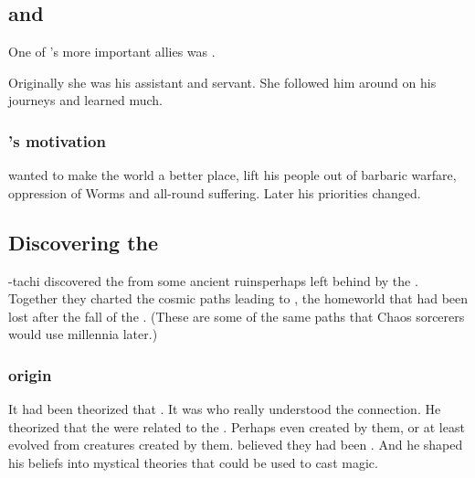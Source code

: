 \subsection[Sethicus and Tyrasshana]{\Sethicus and \Tiamat}
One of \Sethicus's more important allies was . 

Originally she was his assistant and servant.
She followed him around on his journeys and learned much. 





\subsubsection{\Sethicus's motivation}
\Sethicus wanted to make the world a better place, lift his people out of barbaric warfare, oppression of Worms and all-round suffering.
Later his priorities changed. 









\subsection{Discovering the \xss}
\Sethicus-tachi discovered the \xss{} from some ancient ruins\dash perhaps left behind by the \voyagers. 
Together they charted the cosmic paths leading to \Machai, the \xzaishannic{} homeworld that had been lost after the fall of the \ophidians. 
(These are some of the same paths that Chaos sorcerers would use millennia later.)





\subsubsection{\Ophidian origin}
It had been theorized that . 
It was \Sethicus who really understood the connection. 
He theorized that the \ophidians were related to the \xss.
Perhaps even created by them, or at least evolved from creatures created by them.
\Sethicus believed they had been . 
And he shaped his beliefs into mystical theories that could be used to cast magic. 

